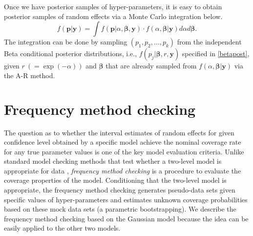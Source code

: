 \documentclass[article]{jss}
\begin{document}


Once we have posterior samples of hyper-parameters, it is easy to obtain posterior samples of random effects via a Monte Carlo integration below.
\begin{equation}\label{mcintegration}
f(\boldsymbol{p}\vert \boldsymbol{y})=\int  f(\boldsymbol{p}\vert \alpha, \boldsymbol{\beta}, \boldsymbol{y})\cdot f(\alpha, \boldsymbol{\beta}\vert \boldsymbol{y})d\alpha d\boldsymbol{\beta}.
\end{equation}
The integration can be done by sampling $(p_1, p_2, \ldots, p_k)$ from the independent Beta conditional posterior distributions, i.e., $f(p_j\vert \boldsymbol{\beta}, r, \boldsymbol{y})$ specified in  \eqref{betapost},  given $r~(=\exp(-\alpha))$ and $\boldsymbol{\beta}$ that are already sampled from $f(\alpha, \boldsymbol{\beta}\vert \boldsymbol{y})$ via the A-R method. 




\section{Frequency method checking}\label{sec4}
The question as to whether the interval estimates of random effects for given confidence level obtained by a specific model achieve the nominal coverage rate  for any true parameter values is one of the key model evaluation criteria. Unlike standard model checking methods that test whether a two-level model is appropriate for data  \citep{dean1992testing, modelchecking1996}, \emph{frequency method checking} is a procedure to evaluate the coverage properties of the model.   Conditioning that the two-level model is appropriate, the frequency method checking generates pseudo-data sets given specific values of hyper-parameters  and estimates unknown coverage probabilities based on these mock data sets (a parametric bootstrapping). We  describe the frequency method checking based on the Gaussian model because the idea can be easily applied to the other two models.
\end{document}
